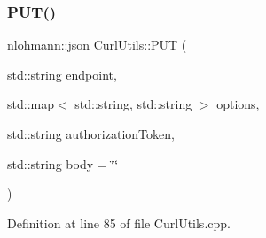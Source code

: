 \subsubsection{\texorpdfstring{P\+U\+T()}{PUT()}}
{\footnotesize\ttfamily nlohmann\+::json Curl\+Utils\+::\+P\+UT (\begin{DoxyParamCaption}\item[{std\+::string}]{endpoint,  }\item[{std\+::map$<$ std\+::string, std\+::string $>$}]{options,  }\item[{std\+::string}]{authorization\+Token,  }\item[{std\+::string}]{body = {\ttfamily \char`\"{}\char`\"{}} }\end{DoxyParamCaption})}



Definition at line 85 of file Curl\+Utils.\+cpp.

